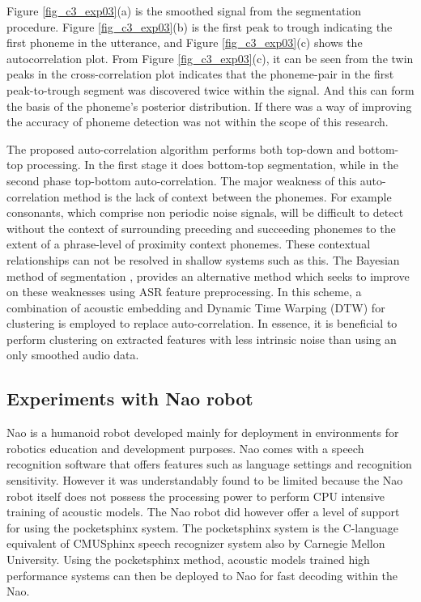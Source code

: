 \startblue
Figure \ref{fig_c3_exp03}(a) is the smoothed signal from the segmentation procedure.  Figure \ref{fig_c3_exp03}(b) is the first peak to trough indicating the first phoneme in the utterance, and Figure \ref{fig_c3_exp03}(c) shows the autocorrelation plot.  From Figure \ref{fig_c3_exp03}(c), it can be seen from the twin peaks in the cross-correlation plot indicates that the phoneme-pair in the first peak-to-trough segment was discovered twice within the signal.  And this can form the basis of the phoneme's posterior distribution.  If there was a way of improving the accuracy of phoneme detection was not within the scope of this research.

The proposed auto-correlation algorithm performs both top-down and bottom-top processing.  In the first stage it does bottom-top segmentation, while in the second phase top-bottom auto-correlation.   The major weakness of this auto-correlation method is the lack of context between the phonemes.  For example consonants, which comprise non periodic noise signals, will be difficult to detect without the context of surrounding preceding and succeeding phonemes to the extent of a phrase-level of proximity context phonemes.  These contextual relationships can not be resolved in shallow systems such as this.  The Bayesian method of segmentation \citep{kamper2016unsupervised}, provides an alternative method which seeks to improve on these weaknesses using ASR feature preprocessing.  In this scheme, a combination of acoustic embedding and Dynamic Time Warping (DTW) for clustering is employed to replace auto-correlation.  In essence, it is beneficial to perform clustering on extracted features with less intrinsic noise than using an only smoothed audio data.\stopblue

\subsection{Experiments with Nao robot}
Nao is a humanoid robot developed mainly for deployment in environments for robotics education and development purposes.  Nao comes with a speech recognition software that offers features such as language settings and recognition sensitivity.  However it was understandably found to be limited because the Nao robot itself does not possess the processing power to perform CPU intensive training of acoustic models.  The Nao robot did however offer a level of support for using the pocketsphinx system. The pocketsphinx system is the C-language equivalent of CMUSphinx speech recognizer system also by Carnegie Mellon University.  Using the pocketsphinx method, acoustic models trained high performance systems can then be deployed to Nao for fast decoding within the Nao.  

